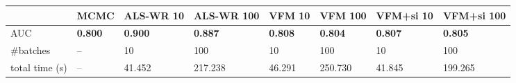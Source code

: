 \begin{tabular}{llllllll}
\toprule
               &         MCMC &          ALS-WR 10 &         ALS-WR 100 &          VFM 10 &         VFM 100 &       VFM+si 10 &      VFM+si 100 \\
\midrule
AUC &  \textbf{0.800} &  \textbf{\alert{0.900}} &  \textbf{0.887} &  \textbf{0.808} &  \textbf{0.804} &  \textbf{0.807} &  \textbf{0.805} \\
\#batches &              -- &              10 &             100 &              10 &             100 &              10 &             100 \\
total time (s) &              -- &          41.452 &         217.238 &          46.291 &         250.730 &          41.845 &         199.265 \\
\bottomrule
\end{tabular}
